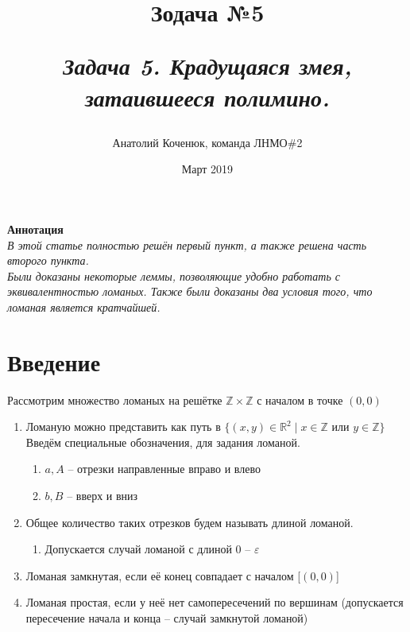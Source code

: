 \documentclass[12pt,a4paper, flushleft]{article}
\author{Анатолий Коченюк, команда ЛНМО\#2}
\date{Март 2019}
\title{Зодача \textsuperscript{\textregistered} №5}
\title{
	\vspace{4cm}	
	\horline{380}	
	\begin{center}
		\begin{Huge}
			\textbf{\emph{Задача 5. Крадущаяся змея, затаившееся полимино.}}
		\end{Huge}
	\end{center}	
	\vspace{-1.3cm}	
	\horline{400}
}
\begin{document}
\maketitle
\vspace{4cm}
	
	\begin{myquote}
	\begin{center}
		\textbf{Аннотация}\\
		\textit{
			В этой статье полностью решён первый пункт, а также решена часть второго пункта.\\
			Были доказаны некоторые леммы, позволяющие удобно работать с эквивалентностью ломаных.
			Также были доказаны два условия того, что ломаная является кратчайшей.
		}
	\end{center}
	\end{myquote}	
	
	\pagebreak

	\tableofcontents	
	
	\pagebreak

\section*{Введение}

Рассмотрим множество ломаных на решётке $\mathds{Z}\times \mathds{Z}$ с началом в точке $(0, 0)$

\begin{enumerate}
	\item Ломаную можно представить как путь в $\{(x, y)\in\mathds{R}^2\mid x\in \mathds{Z} \text{ или } y\in\mathds{Z}\}$
	Введём специальные обозначения, для задания ломаной.
	\begin{enumerate}
		\item[] $a, A$ -- отрезки направленные вправо и влево
		\item[] $b, B$ -- вверх и вниз
	\end{enumerate}
	\item Общее количество таких отрезков будем называть длиной ломаной.
	\begin{enumerate}
		\item []Допускается случай ломаной с длиной 0 -- $\varepsilon$
	\end{enumerate}
	\item Ломаная замкнутая, если её конец совпадает с началом [$(0, 0)$]
	\item Ломаная простая, если у неё нет самопересечений по вершинам (допускается пересечение начала и конца -- случай замкнутой ломаной)	
\end{enumerate}
\end{document}
